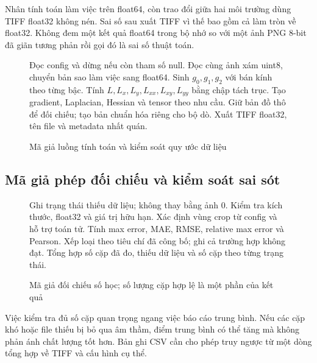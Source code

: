 Nhân tính toán làm việc trên float64, còn trao đổi giữa hai môi trường dùng TIFF float32 không nén. Sai số sau xuất TIFF vì thế bao gồm cả làm tròn về float32. Không đem một kết quả float64 trong bộ nhớ so với một ảnh PNG 8-bit đã giãn tương phản rồi gọi đó là sai số thuật toán.

\begin{figure}[t]
\centering
\begin{minipage}{0.94\textwidth}
\begin{algorithmic}[1]
\STATE Đọc config và dừng nếu còn tham số null.
\STATE Đọc cùng ảnh xám uint8, chuyển bản sao làm việc sang float64.
\STATE Sinh $g_0,g_1,g_2$ với bán kính theo từng bậc.
\STATE Tính $L,L_x,L_y,L_{xx},L_{xy},L_{yy}$ bằng chập tách trục.
\STATE Tạo gradient, Laplacian, Hessian và tensor theo nhu cầu.
\STATE Giữ bản đồ thô để đối chiếu; tạo bản chuẩn hóa riêng cho bộ dò.
\STATE Xuất TIFF float32, tên file và metadata nhất quán.
\ENDFOR
\end{algorithmic}
\end{minipage}
\caption{Mã giả luồng tính toán và kiểm soát quy ước dữ liệu}
\end{figure}

\subsection{Mã giả phép đối chiếu và kiểm soát sai sót}
\begin{figure}[t]
\centering
\begin{minipage}{0.94\textwidth}
\begin{algorithmic}[1]
\STATE Ghi trạng thái thiếu dữ liệu; không thay bằng ảnh 0.
\ELSE
\STATE Kiểm tra kích thước, float32 và giá trị hữu hạn.
\STATE Xác định vùng crop từ config và hỗ trợ toán tử.
\STATE Tính max error, MAE, RMSE, relative max error và Pearson.
\STATE Xếp loại theo tiêu chí đã công bố; ghi cả trường hợp không đạt.
\ENDIF
\ENDFOR
\STATE Tổng hợp số cặp đã đo, thiếu dữ liệu và số cặp theo từng trạng thái.
\end{algorithmic}
\end{minipage}
\caption{Mã giả đối chiếu số học; số lượng cặp hợp lệ là một phần của kết quả}
\end{figure}
Việc kiểm tra đủ số cặp quan trọng ngang việc báo cáo trung bình. Nếu các cặp khó hoặc file thiếu bị bỏ qua âm thầm, điểm trung bình có thể tăng mà không phản ánh chất lượng tốt hơn. Bản ghi CSV cần cho phép truy ngược từ một dòng tổng hợp về TIFF và cấu hình cụ thể.

